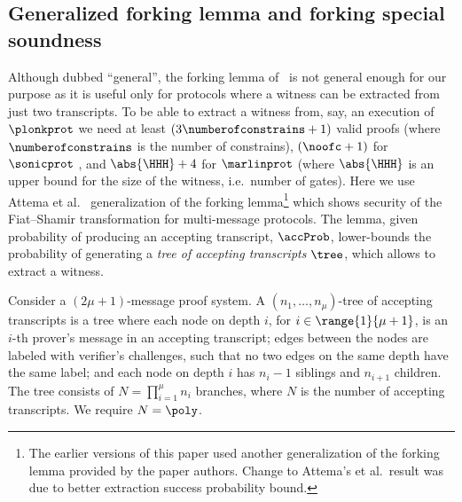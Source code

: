 \subsection{Generalized forking lemma and forking special soundness}
Although dubbed ``general'', the forking lemma of~\cite{CCS:BelNev06} is not general
enough for our purpose as it is useful only for protocols where a witness can be
extracted from just two transcripts. To be able to extract a witness from, say, an
execution of $\plonkprot$ we need at least $(3 \numberofconstrains + 1)$ valid proofs
(where $\numberofconstrains$ is the number of constrains),
$(\noofc + 1)$ for $\sonicprot$ 
, and
$\abs{\HHH} + 4$ for $\marlinprot$ (where $\abs{\HHH}$ is an upper bound for the size
of the witness, i.e.~number of gates). Here we use Attema et
al.~\cite{EPRINT:AttFehKlo21short} generalization of the forking lemma\footnote{The
  earlier versions of this paper used another generalization of the forking lemma
  provided by the paper authors. Change to Attema's et al.~result was due to better
  extraction success probability bound.}  which shows security of the Fiat--Shamir
transformation for multi-message protocols. The lemma, given probability of producing
an accepting transcript, $\accProb$, lower-bounds the probability of generating a
\emph{tree of accepting transcripts} $\tree$, which allows to extract a witness.

\begin{definition}
	\label{def:tree_of_accepting_transcripts}
	Consider a $(2\mu + 1)$-message proof system. A $(n_1,
  \ldots, n_\mu)$-tree of accepting transcripts is a tree where each node on
  depth $i$, for $i \in \range{1}{\mu + 1}$, is an $i$-th prover's message in an
  accepting transcript; edges between the nodes are labeled with verifier's
  challenges, such that no two edges on the same depth have the same
  label; and each node on depth $i$ has $n_{i} - 1$ siblings and $n_{i +
    1}$ children. The tree consists of $N = \prod_{i = 1}^\mu n_i$
  branches, where $N$ is the number of accepting transcripts. We require $N = \poly$.
\end{definition}

\iffalse
		
